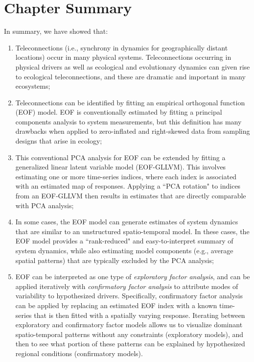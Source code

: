 \section{Chapter Summary}

In summary, we have showed that:
\begin{enumerate}
    \item Teleconnections (i.e., synchrony in dynamics for geographically distant locations) occur in many physical systems. Teleconnections occurring in physical drivers as well as ecological and evolutionary dynamics can given rise to ecological teleconnections, and these are dramatic and important in many ecosystems;

    \item Teleconnections can be identified by fitting an empirical orthogonal function (EOF) model.  EOF is conventionally estimated by fitting a principal components analysis to system measurements, but this definition has many drawbacks when applied to zero-inflated and right-skewed data from sampling designs that arise in ecology;
    
    \item This conventional PCA analysis for EOF can be extended by fitting a generalized linear latent variable model (EOF-GLLVM).  This involves estimating one or more time-series indices, where each index is associated with an estimated map of responses.  Applying a ``PCA rotation" to indices from an EOF-GLLVM then results in estimates that are directly comparable with PCA analysis;    
    
    \item In some cases, the EOF model can generate estimates of system dynamics that are similar to an unstructured spatio-temporal model.  In these cases, the EOF model provides a ``rank-reduced" and easy-to-interpret summary of system dynamics, while also estimating model components (e.g., average spatial patterns) that are typically excluded by the PCA analysis;

    \item EOF can be interpreted as one type of \textit{exploratory factor analysis}, and can be applied iteratively with \textit{confirmatory factor analysis} to attribute modes of variability to hypothesized drivers.  Specifically, confirmatory factor analysis can be applied by replacing an estimated EOF index with a known time-series that is then fitted with a spatially varying response.  Iterating between exploratory and confirmatory factor models allows us to visualize dominant spatio-temporal patterns without any constraints (exploratory models), and then to see what portion of these patterns can be explained by hypothesized regional conditions (confirmatory models).
\end{enumerate}


